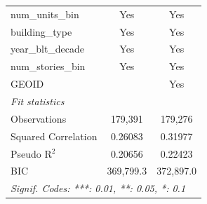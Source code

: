 \begin{tabular}{lcc}
   num\_units\_bin                 & Yes             & Yes\\  
   building\_type                  & Yes             & Yes\\  
   year\_blt\_decade               & Yes             & Yes\\  
   num\_stories\_bin               & Yes             & Yes\\  
   GEOID                           &                 & Yes\\  
   \midrule
   \emph{Fit statistics}\\
   Observations                    & 179,391         & 179,276\\  
   Squared Correlation             & 0.26083         & 0.31977\\  
   Pseudo R$^2$                    & 0.20656         & 0.22423\\  
   BIC                             & 369,799.3       & 372,897.0\\  
   \midrule \midrule
   \multicolumn{3}{l}{\emph{Signif. Codes: ***: 0.01, **: 0.05, *: 0.1}}\\
\end{tabular}
\par\endgroup
\begingroup
\centering
